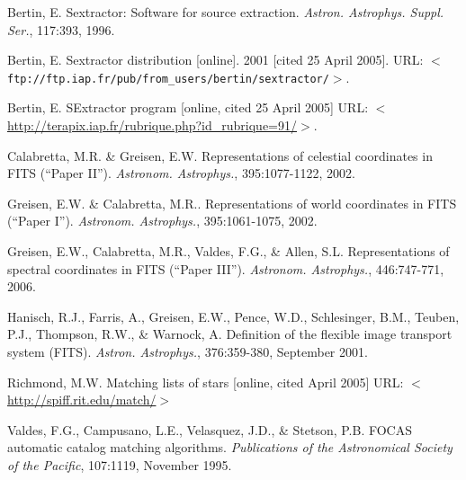 \documentclass[twoside,11pt,nolof]{starlink}
\begin{document}
\begin{thebibliography}{}

 Bertin, E. Sextractor: Software for source
  extraction. \textit{Astron. Astrophys. Suppl. Ser.}, 117:393, 1996.

 Bertin, E. Sextractor distribution [online]. 2001
  [cited 25 April 2005]. URL:
  \texttt{$<$ftp://ftp.iap.fr/pub/from\_users/bertin/sextractor/$>$}.

 Bertin, E. SExtractor program [online, cited 25 April
  2005] URL:
  $<$\url{http://terapix.iap.fr/rubrique.php?id\_rubrique=91/}$>$.

 Calabretta, M.R. \& Greisen, E.W. Representations of
  celestial coordinates in FITS (``Paper II''). \textit{Astronom. Astrophys.},
  395:1077-1122, 2002.

 Greisen, E.W. \& Calabretta, M.R.. Representations of world
  coordinates in FITS (``Paper I''). \textit{Astronom. Astrophys.},
  395:1061-1075, 2002.

 Greisen, E.W., Calabretta, M.R., Valdes, F.G., \& Allen,
  S.L. Representations of spectral coordinates in FITS (``Paper III'').
  \textit{Astronom. Astrophys.}, 446:747-771, 2006.

 Hanisch, R.J., Farris, A., Greisen, E.W., Pence, W.D.,
  Schlesinger, B.M., Teuben, P.J., Thompson, R.W., \& Warnock, A. Definition
  of the flexible image transport system (FITS). \textit{Astron. Astrophys.},
  376:359-380, September 2001.

 Richmond, M.W. Matching lists of stars [online, cited
  April 2005] URL: $<$\url{http://spiff.rit.edu/match/}$>$

 Valdes, F.G., Campusano, L.E., Velasquez, J.D., \& Stetson,
  P.B. FOCAS automatic catalog matching algorithms. \textit{Publications of
    the Astronomical Society of the Pacific}, 107:1119, November 1995.

\end{thebibliography}
\end{document}

